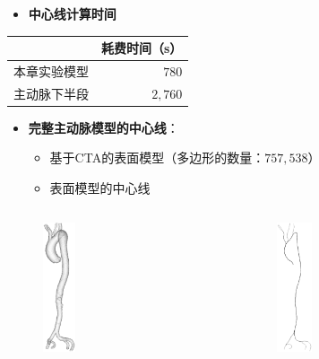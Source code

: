\begin{frame}
\begin{itemize}
  \item \textbf{中心线计算时间}
\end{itemize}
\begin{table}[!ht]
\renewcommand{\arraystretch}{0.5}
\centering
\begin{tabular*}{55mm}{lr}
\toprule
~                                & \small{耗费时间（s）} \\
\midrule
\small{本章实验模型}             & \small{$780$}  \\
\midrule
\small{主动脉下半段}             & \small{$2,760$}  \\
\bottomrule
\end{tabular*}
\end{table}
\end{frame} 

\begin{frame}
\begin{itemize}
  \item \textbf{完整主动脉模型的中心线}：
  \begin{itemize}
    \item 基于CTA的表面模型（多边形的数量：$757,538$）
    \item 表面模型的中心线
  \end{itemize}
\end{itemize}
\begin{columns}[b,onlytextwidth]
\begin{column}{.5\textwidth}
\begin{figure}[t]
\centering
\includegraphics[height=1.5in]{../../Figures/postprocessing/centerlines/surface.eps}
\end{figure}
\end{column}
\begin{column}{.5\textwidth}
\begin{figure}[t]
\centering
\includegraphics[height=1.5in]{../../Figures/postprocessing/centerlines/centerlines.eps}
\end{figure}
\end{column}
\end{columns}
\end{frame}